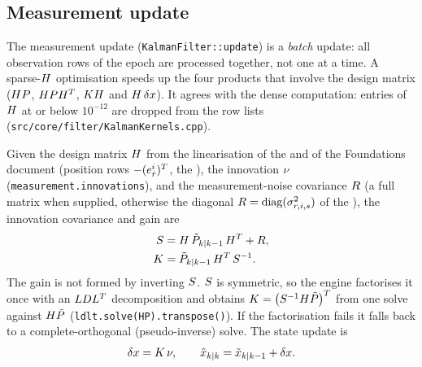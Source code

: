 \documentclass[main.tex]{subfiles}
\begin{document}
\subsection{Measurement update}\label{sec:kf-update}

The measurement update (\texttt{KalmanFilter::update}) is a
\emph{batch} update: all observation rows of the epoch are processed
together, not one at a time.  A sparse-$H$ optimisation speeds up
the four products that involve the design matrix ($HP$,
$HPH^{T}$, $KH$ and $H\,\delta x$).  It agrees
with the dense computation: entries of $H$ at or below $10^{-12}$ are
dropped from the row lists (\texttt{src/core/filter/KalmanKernels.cpp}).

Given the design matrix $H$ from the linearisation of the
 and
 of the Foundations
document (position rows $-(e^i_{\hat{r}})^{T}$, the
), the
innovation $\nu$ (\texttt{measurement.innovations}), and the
measurement-noise covariance $R$ (a full matrix when supplied,
otherwise the diagonal $R = \operatorname{diag}(\sigma^2_{r,i,s})$
of the ), the
innovation covariance and gain are
\begin{align}
S   &= H\,\tilde{P}_{k|k-1}\,H^{T} + R,
\label{eq:kf-S}\\
K  &= \tilde{P}_{k|k-1}\,H^{T}\,S^{-1}.
\label{eq:kf-gain}
\end{align}
The gain is not formed by inverting $S$.  $S$ is symmetric, so
the engine factorises it once with an $LDL^{T}$ decomposition
and obtains $K = \big(S^{-1}H\tilde{P}\big)^{T}$ from
one solve against $H\tilde{P}$
(\texttt{ldlt.solve(HP).transpose()}).  If the factorisation fails it
falls back to a complete-orthogonal (pseudo-inverse) solve.  The state
update is
\begin{equation}
\delta x = K\,\nu,
\qquad
\hat{x}_{k|k} = \tilde{x}_{k|k-1} + \delta x.
\label{eq:kf-state-update}
\end{equation}
\end{document}
